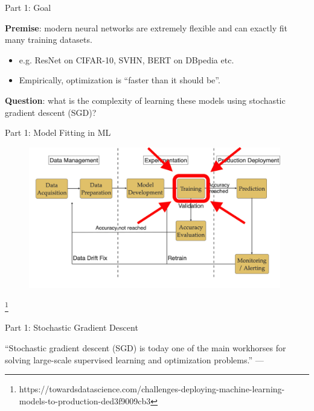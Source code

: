 \documentclass[mathserif,notheorems, hyperref={colorlinks, citecolor=blue, urlcolor=blue, linkcolor=blue}]{beamer}
\newcommand{\source}[1]{{\let\thefootnote\relax\footnote{{\tiny #1}}}}
\def\\{}%
\begin{document}
    \begin{frame}{Part 1: Goal}
        \Large 
        
        \textbf{Premise}: modern neural networks are extremely flexible and can exactly fit many training datasets. 
        \begin{itemize}
            \item \large e.g. ResNet on CIFAR-10, SVHN, BERT on DBpedia etc.  
            \item Empirically, optimization is ``faster than it should be''. 
        \end{itemize}        

        \vspace{4ex} 

        \textbf{Question}: what is the complexity of learning these models using stochastic gradient descent (SGD)?%
        
    \end{frame}

    \begin{frame}{Part 1: Model Fitting in ML}
       
       \begin{figure}
            \centering
            \includegraphics[width=0.98\textwidth]{figures/workflow_highlighted} 
       \end{figure} 

       \source{https://towardsdatascience.com/challenges-deploying-machine-learning-models-to-production-ded3f9009cb3}
    \end{frame}
    
    \begin{frame}{Part 1: Stochastic Gradient Descent}

        \begin{center}
            \Large
            ``Stochastic gradient descent (SGD) is today one of the main workhorses for solving large-scale supervised learning and optimization problems.''\\
            ---\citet{drori2019complexity}
        \end{center}

    \end{frame}
\end{document}

